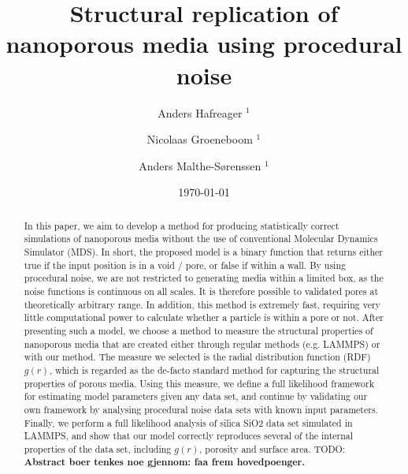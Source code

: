 \documentclass[aps,pre,twocolumn,letterpaper,floatfix,showpacs]{revtex4}
\newcommand{\todo}[1]{ {\color{Magenta} TODO: \color{Blue} \textbf{#1} }}
\begin{document}
\title{Structural replication of nanoporous media using procedural noise}
\author{Anders Hafreager $^{1}$} 
\author{Nicolaas Groeneboom $^{1}$} 
\author{Anders Malthe-S\o renssen $^1$}
\date{\today} 

\begin{abstract} 
In this paper, we aim to develop a method for producing statistically correct simulations of nanoporous media without the use of conventional Molecular Dynamics Simulator (MDS). In short, the proposed model is a binary function that returns either true if the input position is in a void / pore, or false if within a wall. By using procedural noise, we are not restricted to generating media within a limited box, as the noise functions is continuous on all scales. It is therefore possible to validated pores at theoretically arbitrary range. In addition, this method is extremely fast, requiring very little computational power to calculate whether a particle is within a pore or not. After presenting such a model, we choose a method to measure the structural properties of nanoporous media that are created either through regular methods (e.g. LAMMPS) or with our method. The measure we selected is the radial distribution function (RDF) $g(r)$, which is regarded as the de-facto standard method for capturing the structural properties of porous media. Using this measure, we define a full likelihood framework for estimating model parameters given any data set, and continue by validating our own framework by analysing procedural noise data sets with known input parameters. Finally, we perform a full likelihood analysis of silica SiO2 data set simulated in LAMMPS, and show that our model correctly reproduces several of the internal properties of the data set, including $g(r)$, porosity and surface area.  \todo{Abstract boer tenkes noe gjennom: faa frem hovedpoenger.}   

\end{abstract} 
 
\maketitle
 
\end{document}
